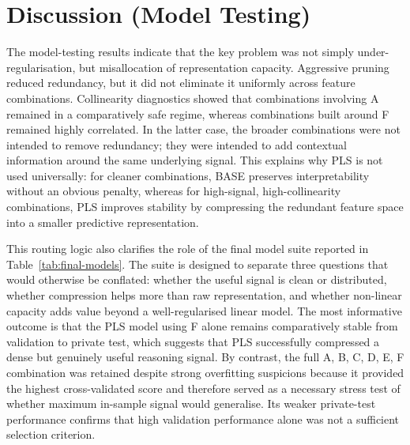 \documentclass{article}
\theoremstyle{plain}
\theoremstyle{definition}
\theoremstyle{remark}
\begin{document}
\section{Discussion (Model Testing)}
The model-testing results indicate that the key problem was not simply under-regularisation, but misallocation of representation capacity. Aggressive pruning reduced redundancy, but it did not eliminate it uniformly across feature combinations. Collinearity diagnostics showed that combinations involving A remained in a comparatively safe regime, whereas combinations built around F remained highly correlated. In the latter case, the broader combinations were not intended to remove redundancy; they were intended to add contextual information around the same underlying signal. This explains why PLS is not used universally: for cleaner combinations, BASE preserves interpretability without an obvious penalty, whereas for high-signal, high-collinearity combinations, PLS improves stability by compressing the redundant feature space into a smaller predictive representation.

This routing logic also clarifies the role of the final model suite reported in Table~\ref{tab:final-models}. The suite is designed to separate three questions that would otherwise be conflated: whether the useful signal is clean or distributed, whether compression helps more than raw representation, and whether non-linear capacity adds value beyond a well-regularised linear model. The most informative outcome is that the PLS model using F alone remains comparatively stable from validation to private test, which suggests that PLS successfully compressed a dense but genuinely useful reasoning signal. By contrast, the full A, B, C, D, E, F combination was retained despite strong overfitting suspicions because it provided the highest cross-validated score and therefore served as a necessary stress test of whether maximum in-sample signal would generalise. Its weaker private-test performance confirms that high validation performance alone was not a sufficient selection criterion.
\end{document}
